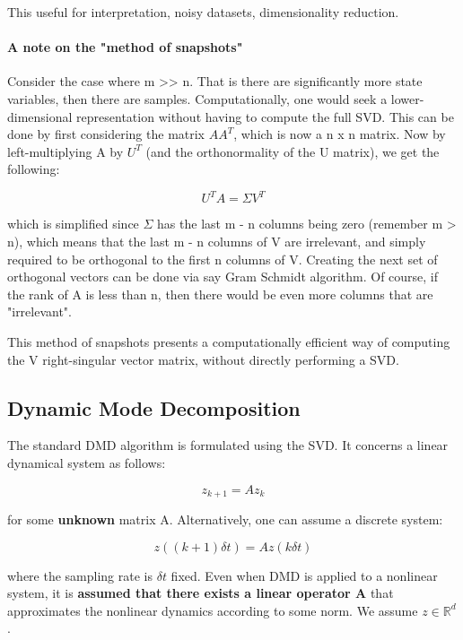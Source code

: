\documentclass{article}
\theoremstyle{definition}
\theoremstyle{remark}
\theoremstyle{lemma}
\theoremstyle{theorem}
\theoremstyle{corollary}
\theoremstyle{property}
\begin{document}
			This useful for interpretation, noisy datasets, dimensionality reduction.

			\paragraph{A note on the "method of snapshots"}
			Consider the case where m >> n. That is there are significantly more state variables, then there are samples. Computationally, one would seek a lower-dimensional representation without having to compute the full SVD. This can be done by first considering the matrix $AA^T$, which is now a n x n matrix. Now by left-multiplying A by $U^T$ (and the orthonormality of the U matrix), we get the following:

				$$U^T A = \Sigma V^T$$

			which is simplified since $\Sigma$ has the last m - n columns being zero (remember m > n), which means that the last m - n columns of V are irrelevant, and simply required to be orthogonal to the first n columns of V. Creating the next set of orthogonal vectors can be done via say Gram Schmidt algorithm. Of course, if the rank of A is less than n, then there would be even more columns that are "irrelevant". 

			This method of snapshots presents a computationally efficient way of computing the V right-singular vector matrix, without directly performing a SVD.

	\subsection{Dynamic Mode Decomposition}
		The standard DMD algorithm is formulated using the SVD. It concerns a linear dynamical system as follows:

			$$z_{k+1} = A z_k$$

		for some \textbf{unknown} matrix A. Alternatively, one can assume a discrete system:

			$$z((k+1)\delta t) = A z(k \delta t)$$

		where the sampling rate is $\delta t$ fixed. Even when DMD is applied to a nonlinear system, it is \textbf{assumed that there exists a linear operator A} that approximates the nonlinear dynamics according to some norm. We assume $z \in \mathbb{R}^d$.
\end{document}
